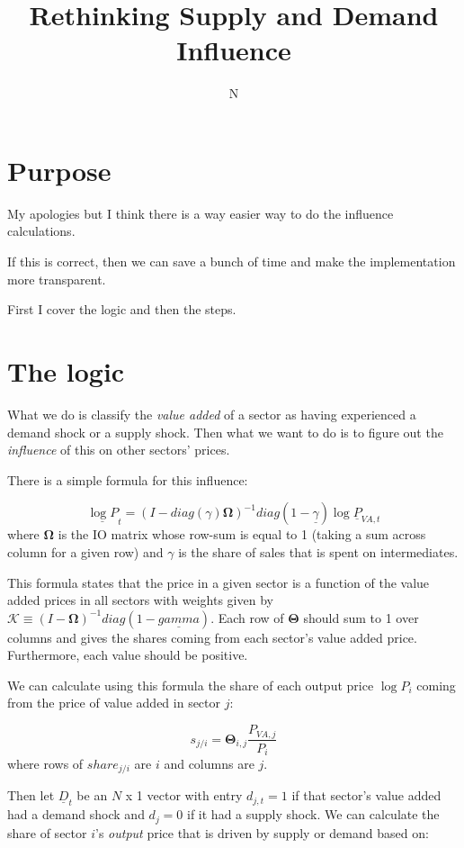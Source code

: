 \documentclass[12pt,english]{article}
\begin{document}
\title{Rethinking Supply and Demand Influence}
\author{N}
\maketitle
\vspace{-1.2cm}
\section{Purpose}
My apologies but I think there is a way easier way to do the influence calculations.

If this is correct, then we can save a bunch of time and make the implementation more transparent.

First I cover the logic and then the steps.

\section{The logic}

What we do is classify the \emph{value added} of a sector as having experienced a demand shock or a supply shock. Then what we want to do is to figure out the \emph{influence} of this on other sectors' prices.

There is a simple formula for this influence:

\[
	\underline{\log P}_t = (I-diag(\gamma)\mathbold{\Omega})^{-1}diag(1-\underline{\gamma})\log \underline{P}_{VA,t}
\]
where $\mathbold{\Omega}$ is the IO matrix whose row-sum is equal to 1 (taking a sum across column for a given row) and $\gamma$ is the share of sales that is spent on intermediates.

This formula states that the price in a given sector is a function of the value added prices in all sectors with weights given by $\mathcal{K} \equiv (I-\mathbold{\Omega})^{-1}diag(1-\underline{gamma})$. Each row of $\mathbold{\Theta}$ should sum to 1 over columns and gives the shares coming from each sector's value added price. Furthermore, each value should be positive.

We can calculate using this formula the share of each output price $\log P_i$ coming from the price of value added in sector $j$:

\[
	s_{j/i} = \mathbold{\Theta}_{i,j} \frac{P_{VA,j}}{P_i}
\]
where rows of $share_{j/i}$ are $i$ and columns are $j$. 

Then let $\underline{D}_t$ be an $N$ x 1 vector with entry $d_{j,t}=1$ if that sector's value added had a demand shock and $d_j=0$ if it had a supply shock. We can calculate the share of sector $i$'s \emph{output} price that is driven by supply or demand based on:
\end{document}
